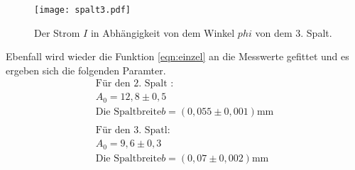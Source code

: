 \begin{figure}
  \centering
  \texttt{[image: spalt3.pdf]}
  \caption{ Der Strom $I$ in Abhängigkeit von dem Winkel $phi$ von dem 3. Spalt.}
  \label{fig:spalt3}
\end{figure}

Ebenfall wird wieder die Funktion \eqref{eqn:einzel}
an die Messwerte gefittet und es ergeben sich die folgenden Paramter.
\begin{align*}
  \text{Für den 2. Spalt :}\\
  A_0=12,8\pm0,5\\
\text{Die Spaltbreite} b=(0,055\pm0,001)\si{\milli\meter}\\
\\
\text{Für den 3. Spatl:}\\
  A_0=9,6\pm0,3\\
  \text{Die Spaltbreite} b=(0,07\pm0,002)\si{\milli\meter}\\
\end{align*}

